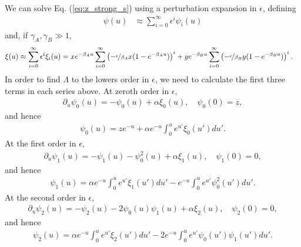 \documentclass[aps,rmp,twocolumn,groupedaddress,floatfix,notitlepage]{revtex4-1}
\begin{document}
We can solve Eq. (\ref{eq:z_strong_s}) using a perturbation expansion in $\epsilon$, defining 
\begin{align}
    \psi(u) &\approx \sum_{i=0}^\infty \epsilon^i \psi_i (u) \label{eq:psi(u)_series}
\end{align}
and, if $\gamma_A,\gamma_B \gg 1$,
\begin{align}
    \xi (u) &\approx \sum_{i=0}^\infty \epsilon^i \xi_i (u) = xe^{-\beta_A u} \sum_{i=0}^\infty \left(-\nicefrac{\epsilon}{\beta_A}x(1-e^{-\beta_A u})\right)^i
    + ye^{-\beta_B u} \sum_{i=0}^\infty \left(-\nicefrac{\epsilon}{\beta_B}y(1-e^{-\beta_B u})\right)^i
    .\label{eq:f(u)_series}
\end{align}
In order to find $\Lambda$ to the lowers order in $\epsilon$, we need to calculate the first three terms in each series above.
At zeroth order in $\epsilon$,
\begin{align}
    \partial_u \psi_0(u) = -\psi_0(u) + \alpha \xi_0(u), \quad \psi_0(0) = z,
\end{align}
and hence 
\begin{align}
    \psi_0(u) = ze^{-u} + \alpha e^{-u} \int_0^u e^{u'} \xi_0(u') du'.
\end{align}
At the first order in $\epsilon$,
\begin{align}
    \partial_u \psi_1(u) = -\psi_1(u) -\psi_0^2(u) + \alpha \xi_1(u), \quad \psi_1(0) = 0,
\end{align}
and hence 
\begin{align}
    \psi_1(u) = \alpha e^{-u} \int_0^u e^{u'} \xi_1(u') du' - e^{-u} \int_0^u e^{u'} \psi_0^2 (u') du'.
\end{align}
At the second order in $\epsilon$,
\begin{align}
    \partial_u \psi_2(u) = -\psi_2(u) -2\psi_0(u)\psi_1(u) + \alpha \xi_2(u), \quad \psi_2(0) = 0,
\end{align}
and hence 
\begin{align}
    \psi_2(u) = \alpha e^{-u} \int_0^u e^{u'} \xi_2(u') du' - 2e^{-u} \int_0^u e^{u'} \psi_0(u')\psi_1(u') du'.
\end{align}
\end{document}

